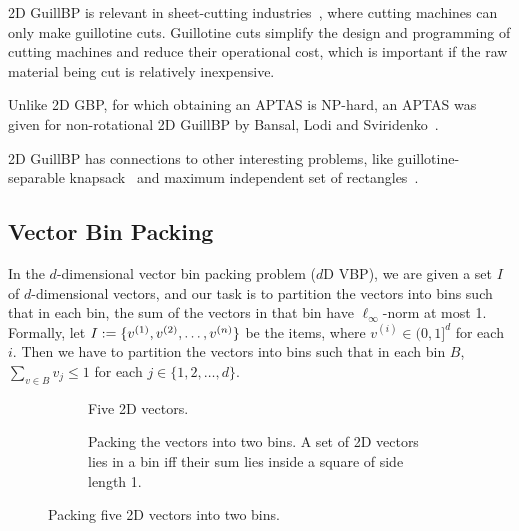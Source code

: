 2D GuillBP is relevant in sheet-cutting
industries~\cite{mchale1999cutting,puchinger2004solving,schneider1988trim},
where cutting machines can only make guillotine cuts.
Guillotine cuts simplify the design and programming of cutting machines
and reduce their operational cost, which is important if
the raw material being cut is relatively inexpensive.

Unlike 2D GBP, for which obtaining an APTAS is NP-hard,
an APTAS was given for non-rotational 2D GuillBP
by Bansal, Lodi and Sviridenko~\cite{bansal2005tale}.

2D GuillBP has connections to other interesting problems,
like guillotine-separable knapsack~\cite{khan2021guillotine}
and maximum independent set of rectangles~\cite{abed2015guillotine,khan2020guillotine}.

\subsection{Vector Bin Packing}

In the $d$-dimensional vector bin packing problem ($d$D VBP),
we are given a set $I$ of $d$-dimensional vectors,
and our task is to partition the vectors into bins such that in each bin,
the sum of the vectors in that bin have $\ell_\infty$-norm at most 1.
Formally, let $I := \{v^{(1)}, v^{(2)}, \ldots, v^{(n)}\}$ be the items,
where $v^{(i)} \in (0, 1]^d$ for each $i$.
Then we have to partition the vectors into bins such that in each bin $B$,
$\sum_{v \in B} v_j \le 1$ for each $j \in \{1, 2, \ldots, d\}$.

\begin{figure}[htb]
\centering
\begin{subfigure}{0.45\textwidth}
    \centering
    
    \caption{Five 2D vectors.}
\end{subfigure}
\begin{subfigure}{0.54\textwidth}
    \centering
    
    \caption{Packing the vectors into two bins.
    A set of 2D vectors lies in a bin iff their sum
    lies inside a square of side length 1.}
\end{subfigure}
\caption{Packing five 2D vectors into two bins.}
\label{fig:2vbp}
\end{figure}

